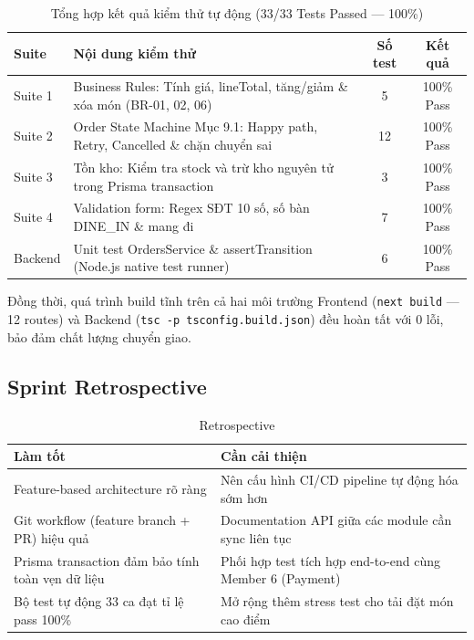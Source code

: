\documentclass[12pt,a4paper]{article}
\begin{document}
\begin{table}[H]
\centering
\caption{Tổng hợp kết quả kiểm thử tự động (33/33 Tests Passed — 100\%)}
\small
\begin{tabularx}{\textwidth}{lXcc}
\toprule
\textbf{Suite} & \textbf{Nội dung kiểm thử} & \textbf{Số test} & \textbf{Kết quả} \\
\midrule
Suite 1 & Business Rules: Tính giá, lineTotal, tăng/giảm \& xóa món (BR-01, 02, 06) & 5 & 100\% Pass \\
Suite 2 & Order State Machine Mục 9.1: Happy path, Retry, Cancelled \& chặn chuyển sai & 12 & 100\% Pass \\
Suite 3 & Tồn kho: Kiểm tra stock và trừ kho nguyên tử trong Prisma transaction & 3 & 100\% Pass \\
Suite 4 & Validation form: Regex SĐT 10 số, số bàn DINE\_IN \& mang đi & 7 & 100\% Pass \\
Backend & Unit test OrdersService \& assertTransition (Node.js native test runner) & 6 & 100\% Pass \\
\bottomrule
\end{tabularx}
\end{table}

Đồng thời, quá trình build tĩnh trên cả hai môi trường Frontend (\texttt{next build} — 12 routes) và Backend (\texttt{tsc -p tsconfig.build.json}) đều hoàn tất với 0 lỗi, bảo đảm chất lượng chuyển giao.

\subsection{Sprint Retrospective}

\begin{table}[H]
\centering
\caption{Retrospective}
\begin{tabularx}{\textwidth}{XX}
\toprule
\textbf{Làm tốt} & \textbf{Cần cải thiện} \\
\midrule
Feature-based architecture rõ ràng & Nên cấu hình CI/CD pipeline tự động hóa sớm hơn \\
Git workflow (feature branch + PR) hiệu quả & Documentation API giữa các module cần sync liên tục \\
Prisma transaction đảm bảo tính toàn vẹn dữ liệu & Phối hợp test tích hợp end-to-end cùng Member 6 (Payment) \\
Bộ test tự động 33 ca đạt tỉ lệ pass 100\% & Mở rộng thêm stress test cho tải đặt món cao điểm \\
\bottomrule
\end{tabularx}
\end{table}
\end{document}
